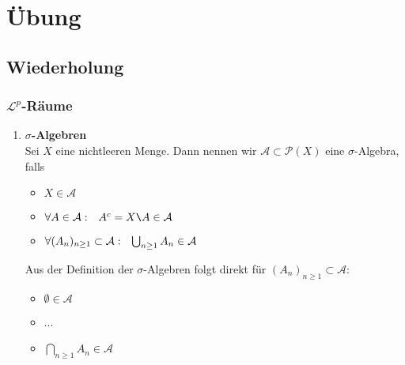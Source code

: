 
\chapter{Übung}

\section{Wiederholung}

\subsection{$\mathcal{L}^{p}$-Räume}
\begin{enumerate}
	\item \textbf{$\sigma$-Algebren} \\
	Sei $X$ eine nichtleeren Menge. Dann nennen wir $\mathcal{A} \subset \mathcal{P}(X)$ eine $\sigma$-Algebra, falls
		\begin{itemize}
			\item $X \in \mathcal{A}$
			\item $\forall A \in \mathcal{A}: \hspace{0.25cm} A^{c} = X\verb|\|A \in \mathcal{A}$
			\item $\forall (A_{n})_{n \geq 1} \subset \mathcal{A}: \hspace{0.25cm} \bigcup_{n \geq 1} A_{n} \in \mathcal{A}$
		\end{itemize}
	\begin{bemerkung}
		Aus der Definition der $\sigma$-Algebren folgt direkt für $(A_{n})_{n \geq 1} \subset \mathcal{A}$:
		\begin{itemize}
			\item $\emptyset \in \mathcal{A}$
			\item ...
			\item $\bigcap_{n \geq 1} A_{n} \in \mathcal{A}$
		\end{itemize}
	\end{bemerkung}

\end{enumerate}